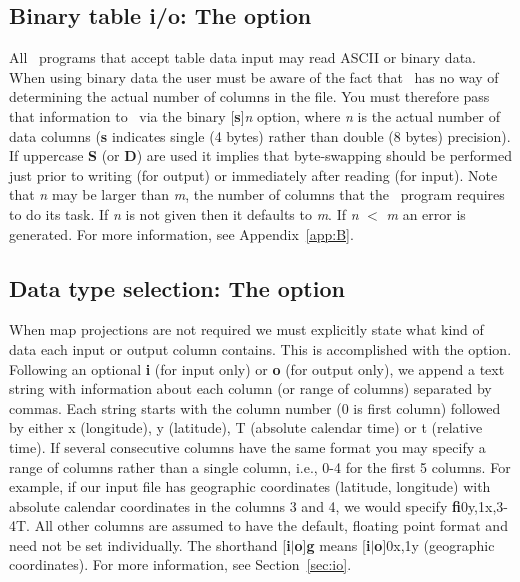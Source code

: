 \subsection{Binary table i/o: The  option}

All \GMT\ programs that accept table data input may read ASCII
or binary data.  When using binary data the user must be aware
of the fact that \GMT\ has no way of determining the actual
number of columns in the file.  You must therefore pass that
information to \GMT\ via the binary [\textbf{s}]\emph{n} option,
where \emph{n} is the actual number of data columns (\textbf{s}
indicates single (4 bytes) rather than double (8 bytes) precision).  If uppercase
\textbf{S} (or \textbf{D}) are used it implies that byte-swapping should be performed
just prior to writing (for output) or immediately after  reading (for input).
Note that \emph{n} may be larger than \emph{m}, the number of
columns that the \GMT\ program requires to do its task.  If
\emph{n} is not given then it defaults to \emph{m}.  If
\emph{n} $<$ \emph{m} an error is generated.  For more information,
see Appendix~\ref{app:B}.

\subsection{Data type selection: The  option}

When map projections are not required we must explicitly state
what kind of data each input or output column contains.  This is accomplished with
the  option.  Following an optional \textbf{i} (for input only) or \textbf{o} (for output
only), we append a text string with information about each column (or range of columns) separated by commas.
Each string starts with the column number (0 is first column) followed by either
x (longitude), y (latitude), T (absolute calendar time) or t (relative time).  If
several consecutive columns have the same format you may specify a range of columns
rather than a single column, i.e., 0-4 for the first 5 columns.  For example, if our
input file has geographic coordinates (latitude, longitude) with absolute calendar
coordinates in the columns 3 and 4, we would specify \textbf{fi}0y,1x,3-4T.  All other columns
are assumed to have the default, floating point format and need not be set individually.
The shorthand [\textbf{i}$|$\textbf{o}]\textbf{g} means [\textbf{i}$|$\textbf{o}]0x,1y (geographic coordinates).
For more information, see Section~\ref{sec:io}.

